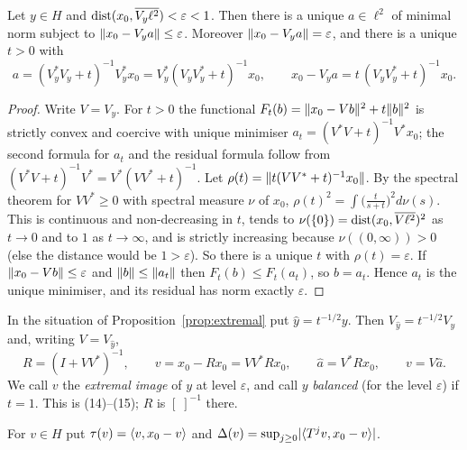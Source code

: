 \begin{proposition}\label{prop:extremal}\stproved{}
Let $y\in H$ and $\operatorname{dist}(x_0,\overline{V_y\ell^2})<\varepsilon<1$. Then there is a unique
$a\in\ell^2$ of minimal norm subject to $\lVert x_0-V_ya\rVert\le\varepsilon$. Moreover
$\lVert x_0-V_ya\rVert=\varepsilon$, and there is a unique $t>0$ with
\[
a=(V_y^*V_y+t)^{-1}V_y^*x_0=V_y^*(V_yV_y^*+t)^{-1}x_0,\qquad
x_0-V_ya=t\,(V_yV_y^*+t)^{-1}x_0 .
\]
\end{proposition}
\begin{proof}
Write $V=V_y$. For $t>0$ the functional $F_t(b)=\lVert x_0-Vb\rVert^2+t\lVert b\rVert^2$ is strictly convex
and coercive with unique minimiser $a_t=(V^*V+t)^{-1}V^*x_0$; the second formula for $a_t$ and
the residual formula follow from $(V^*V+t)^{-1}V^*=V^*(VV^*+t)^{-1}$. Let
$\rho(t)=\lVert t(VV^*+t)^{-1}x_0\rVert$. By the spectral theorem for $VV^*\ge0$ with spectral measure
$\nu$ of $x_0$, $\rho(t)^2=\int\bigl(\tfrac{t}{s+t}\bigr)^2d\nu(s)$. This is continuous and
non-decreasing in $t$, tends to $\nu(\{0\})=\operatorname{dist}(x_0,\overline{V\ell^2})^2$ as $t\to0$ and to
$1$ as $t\to\infty$, and is strictly increasing because $\nu((0,\infty))>0$ (else the distance
would be $1>\varepsilon$). So there is a unique $t$ with $\rho(t)=\varepsilon$. If
$\lVert x_0-Vb\rVert\le\varepsilon$ and $\lVert b\rVert\le\lVert a_t\rVert$ then $F_t(b)\le F_t(a_t)$, so $b=a_t$.
Hence $a_t$ is the unique minimiser, and its residual has norm exactly $\varepsilon$.
\end{proof}

\begin{definition}\label{def:balanced}
In the situation of Proposition~\ref{prop:extremal} put $\hat y=t^{-1/2}y$. Then
$V_{\hat y}=t^{-1/2}V_y$ and, writing $V=V_{\hat y}$,
\[
R=(I+VV^*)^{-1},\qquad v=x_0-Rx_0=VV^*Rx_0,\qquad \hat a=V^*Rx_0,\qquad v=V\hat a .
\]
We call $v$ the \emph{extremal image} of $y$ at level $\varepsilon$, and call $y$
\emph{balanced} (for the level $\varepsilon$) if $t=1$. This is \paper{} (14)--(15); $R$ is $[\;]^{-1}$ there.
\end{definition}

\begin{definition}[Defect]
For $v\in H$ put $\tau(v)=\langle v,x_0-v\rangle$ and
$\Delta(v)=\sup_{j\ge0}\lvert \langle T^jv,x_0-v\rangle\rvert$.
\end{definition}

